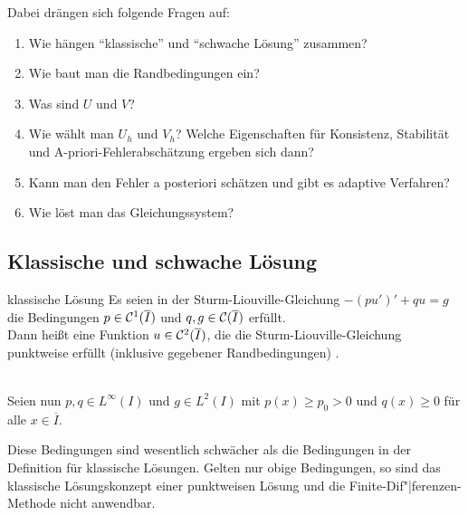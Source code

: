 \begin{Bem}
    Dabei drängen sich folgende Fragen auf:
    \begin{enumerate}
        \item
        Wie hängen "`klassische"' und "`schwache Lösung"' zusammen?

        \item
        Wie baut man die Randbedingungen ein?

        \item
        Was sind $U$ und $V$?

        \item
        Wie wählt man $U_h$ und $V_h$?
        Welche Eigenschaften für Konsistenz, Stabilität und
        A-priori-Fehlerabschätzung ergeben sich dann?

        \item
        Kann man den Fehler a posteriori schätzen und gibt es
        adaptive Verfahren?

        \item
        Wie löst man das Gleichungssystem?
    \end{enumerate}
\end{Bem}

\pagebreak

\subsection{%
    Klassische und schwache Lösung%
}

\begin{Def}{klassische Lösung}
    Es seien in der Sturm-Liouville-Gleichung $-(pu')' + qu = g$
    die Bedingungen $p \in \mathcal{C}^1(\overline{I})$ und
    $q, g \in \mathcal{C}(\overline{I})$ erfüllt.\\
    Dann heißt eine Funktion $u \in \mathcal{C}^2(\overline{I})$, die die
    Sturm-Liouville-Gleichung punktweise erfüllt
    (inklusive gegebener Randbedingungen)
    .
\end{Def}

\begin{Bem}\\
    Seien nun $p, q \in L^\infty(I)$ und $g \in L^2(I)$ mit
    $p(x) \ge p_0 > 0$ und $q(x) \ge 0$ für alle $x \in \overline{I}$.
\end{Bem}

\begin{Bem}
    Diese Bedingungen sind wesentlich schwächer als die Bedingungen
    in der Definition für klassische Lösungen.
    Gelten nur obige Bedingungen, so sind das klassische Lösungskonzept einer
    punktweisen Lösung und die Finite-Dif"|ferenzen-Methode nicht anwendbar.
\end{Bem}


